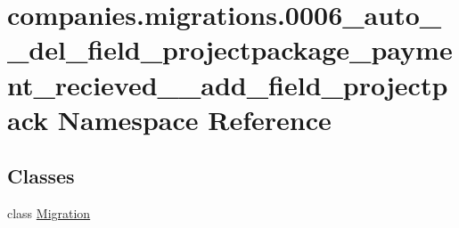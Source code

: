 \hypertarget{namespacecompanies_1_1migrations_1_10006__auto____del__field__projectpackage__payment__recieved____add__field__projectpack}{\section{companies.\-migrations.0006\-\_\-auto\-\_\-\-\_\-del\-\_\-field\-\_\-projectpackage\-\_\-payment\-\_\-recieved\-\_\-\-\_\-add\-\_\-field\-\_\-projectpack Namespace Reference}
\label{namespacecompanies_1_1migrations_1_10006__auto____del__field__projectpackage__payment__recieved____add__field__projectpack}
}
\subsection*{Classes}
\begin{DoxyCompactItemize}
\item 
class \hyperlink{classcompanies_1_1migrations_1_10006__auto____del__field__projectpackage__payment__recieved____a718d6be8a503b6c2d4c720ce698bce11}{Migration}
\end{DoxyCompactItemize}
